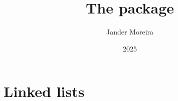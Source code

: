 \documentclass[a4paper, 11pt]{article}
\title{The \PackageName{dsdraw} package}
\author{Jander Moreira}
\date{2025}
\begin{document}
\maketitle
\tableofcontents

\PDPrintChanges

\section{Linked lists}
\end{document}
